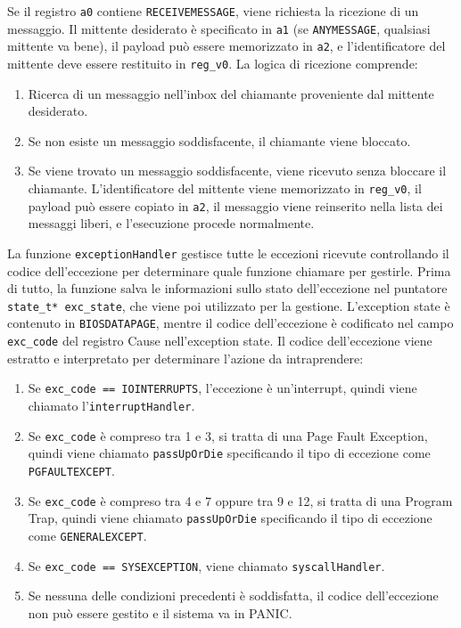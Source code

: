 \documentclass[a4paper]{article}
\begin{document}
Se il registro \verb+a0+ contiene \verb+RECEIVEMESSAGE+, viene richiesta la ricezione di un messaggio. Il mittente desiderato è specificato in \verb+a1+ (se \verb+ANYMESSAGE+, qualsiasi mittente va bene), il payload può essere memorizzato in \verb+a2+, e l'identificatore del mittente deve essere restituito in \verb+reg_v0+. La logica di ricezione comprende:
\begin{enumerate}
\item Ricerca di un messaggio nell'inbox del chiamante proveniente dal mittente desiderato.
\item Se non esiste un messaggio soddisfacente, il chiamante viene bloccato.
\item Se viene trovato un messaggio soddisfacente, viene ricevuto senza bloccare il chiamante. L'identificatore del mittente viene memorizzato in \verb+reg_v0+, il payload può essere copiato in \verb+a2+, il messaggio viene reinserito nella lista dei messaggi liberi, e l'esecuzione procede normalmente.
\end{enumerate}

La funzione \verb+exceptionHandler+ gestisce tutte le eccezioni ricevute controllando il codice dell'eccezione per determinare quale funzione chiamare per gestirle. Prima di tutto, la funzione salva le informazioni sullo stato dell'eccezione nel puntatore \verb+state_t* exc_state+, che viene poi utilizzato per la gestione. L'exception state è contenuto in \verb+BIOSDATAPAGE+, mentre il codice dell'eccezione è codificato nel campo \verb+exc_code+ del registro Cause nell'exception state. Il codice dell'eccezione viene estratto e interpretato per determinare l'azione da intraprendere:
\begin{enumerate}
\item Se \verb+exc_code == IOINTERRUPTS+, l'eccezione è un'interrupt, quindi viene chiamato l'\verb+interruptHandler+.
\item Se \verb+exc_code+ è compreso tra 1 e 3, si tratta di una Page Fault Exception, quindi viene chiamato \verb+passUpOrDie+ specificando il tipo di eccezione come \verb+PGFAULTEXCEPT+.
\item Se \verb+exc_code+ è compreso tra 4 e 7 oppure tra 9 e 12, si tratta di una Program Trap, quindi viene chiamato \verb+passUpOrDie+ specificando il tipo di eccezione come \verb+GENERALEXCEPT+.
\item Se \verb+exc_code == SYSEXCEPTION+, viene chiamato \verb+syscallHandler+.
\item Se nessuna delle condizioni precedenti è soddisfatta, il codice dell'eccezione non può essere gestito e il sistema va in PANIC.
\end{enumerate}
\end{document}

